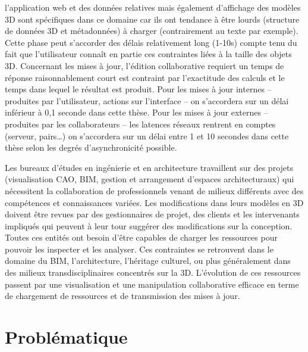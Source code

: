l'application web et des données relatives mais également d'affichage des 
modèles 3D sont spécifiques dans ce domaine car ils ont 
tendance à être lourds (structure de données 3D et métadonnées) à charger 
(contrairement au texte par exemple). Cette phase peut s'accorder des délais 
relativement long (1-10s) compte tenu du fait que l'utilisateur connaît en partie ces 
contraintes liées à la taille des objets 3D. Concernant les mises à jour, l'édition 
collaborative requiert un temps de réponse raisonnablement court est contraint par 
l'exactitude des calculs et le temps dans lequel le résultat est produit. Pour les 
mises à jour internes -- produites par l'utilisateur, actions sur l'interface -- on 
s'accordera sur un délai inférieur à 0,1 seconde dans cette thèse. 
Pour les mises à jour externes -- produites par les collaborateurs -- les latences 
réseaux rentrent en comptes (serveur, pairs\ldots) on s'accordera sur un délai 
entre 1 et 10 secondes dans cette thèse selon les degrés d'asynchronicité 
possible. 

Les bureaux d'études en ingénierie et en architecture travaillent sur des projets 
(visualisation \gls{CAO}, \gls{BIM}, gestion et arrangement d'espaces 
architecturaux) qui 
nécessitent la collaboration de professionnels venant de milieux différents avec 
des compétences et connaissances variées. Les modifications dans leurs 
modèles en \gls{3D} doivent être revues par des gestionnaires de projet, des 
clients et les intervenants impliqués qui peuvent à leur tour suggérer des 
modifications sur la conception. Toutes ces entités ont besoin d'être capables de 
charger les ressources pour pouvoir les inspecter et les analyser. Ces contraintes 
se retrouvent dans le domaine du \gls{BIM}, l'architecture, l'héritage culturel, ou 
plus généralement dans des milieux transdisciplinaires concentrés sur la \gls{3D}. 
L'évolution de ces ressources passent par une visualisation et une manipulation 
collaborative efficace en terme de chargement de ressources et de transmission 
des mises à jour.




\section{Problématique}




